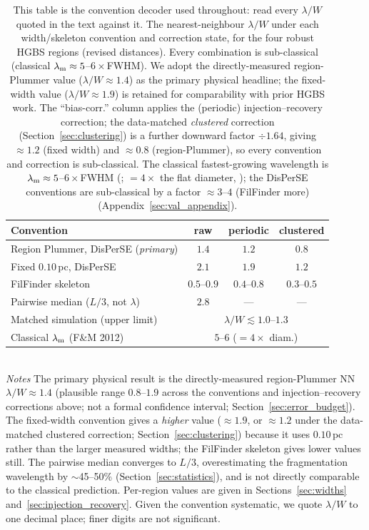 \documentclass[usenatbib,twoside,twocolumn]{mnras}
\begin{document}
\begin{table}
\caption{This table is the convention decoder used throughout: read every $\lambda/W$ quoted in the text against it. The nearest-neighbour $\lambda/W$ under each width/skeleton convention and correction state, for the four robust HGBS regions (revised distances). Every combination is sub-classical (classical $\lambda_{\rm m}\approx5$--$6\times$FWHM). We adopt the directly-measured region-Plummer value ($\lambda/W\approx1.4$) as the primary physical headline; the fixed-width value ($\lambda/W\approx1.9$) is retained for comparability with prior HGBS work. The ``bias-corr.'' column applies the (periodic) injection--recovery correction; the data-matched \emph{clustered} correction (Section~\ref{sec:clustering}) is a further downward factor $\div1.64$, giving $\approx1.2$ (fixed width) and $\approx0.8$ (region-Plummer), so every convention and correction is sub-classical. The classical fastest-growing wavelength is $\lambda_{\rm m}\approx5$--$6\times$FWHM (\citealt{Fischera2012}; $=4\times$ the flat diameter, \citealt{Inutsuka1992}); the DisPerSE conventions are sub-classical by a factor $\approx3$--$4$ (FilFinder more) (Appendix~\ref{sec:val_appendix}).}
\label{tab:headline}
\footnotesize
\setlength{\tabcolsep}{4pt}
\begin{tabular}{p{3.6cm}ccc}
\toprule
Convention & raw & periodic & clustered \\
\midrule
Region Plummer, DisPerSE (\emph{primary}) & $1.4$ & $1.2$ & $0.8$ \\
Fixed $0.10$\,pc, DisPerSE & $2.1$ & $1.9$ & $1.2$ \\
FilFinder skeleton & $0.5$--$0.9$ & $0.4$--$0.8$ & $0.3$--$0.5$ \\
Pairwise median ($L/3$, not $\lambda$) & $2.8$ & --- & --- \\
\midrule
Matched simulation (upper limit) & \multicolumn{3}{c}{$\lambda/W\lesssim1.0$--$1.3$} \\
Classical $\lambda_{\rm m}$ (F\&M 2012) & \multicolumn{3}{c}{$5$--$6$ ($=4\times$ diam.)} \\
\bottomrule
\end{tabular}
\\[2pt]
\footnotesize
\emph{Notes} The primary physical result is the directly-measured region-Plummer NN $\lambda/W\approx1.4$ (plausible range $0.8$--$1.9$ across the conventions and injection--recovery corrections above; not a formal confidence interval; Section~\ref{sec:error_budget}). The fixed-width convention gives a \emph{higher} value ($\approx1.9$, or $\approx1.2$ under the data-matched clustered correction; Section~\ref{sec:clustering}) because it uses $0.10$\,pc rather than the larger measured widths; the FilFinder skeleton gives lower values still. The pairwise median converges to $L/3$, overestimating the fragmentation wavelength by $\sim$45--50\% (Section~\ref{sec:statistics}), and is not directly comparable to the classical prediction. Per-region values are given in Sections~\ref{sec:widths} and~\ref{sec:injection_recovery}. Given the convention systematic, we quote $\lambda/W$ to one decimal place; finer digits are not significant.
\end{table}
\end{document}
